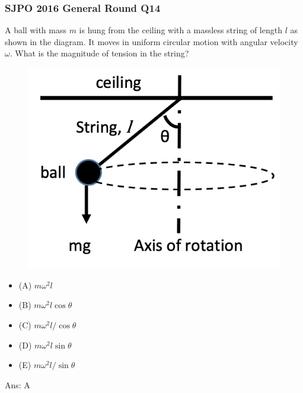 \documentclass{article}
\begin{document}
\subsubsection{SJPO 2016 General Round Q14}
A ball with mass $m$ is hung from the ceiling with a massless string of length $l$ as shown in the diagram. It moves in uniform circular motion with angular velocity $\omega$. What is the magnitude of tension in the string? \\
{
\begin{figure}
\includegraphics[width=1.0\linewidth]{images/sjpo2016q14.png}
\end{figure}
\begin{itemize}
\item[] (A) $m \omega^2 l$
\item[] (B) $m \omega^2 l \cos \theta$
\item[] (C) $m \omega^2 l / \cos \theta$
\item[] (D) $m \omega^2 l \sin \theta$
\item[] (E) $m \omega^2 l / \sin \theta$
\end{itemize}
}
Ans: \ifpaper A \fi

\newpage
\end{document}
